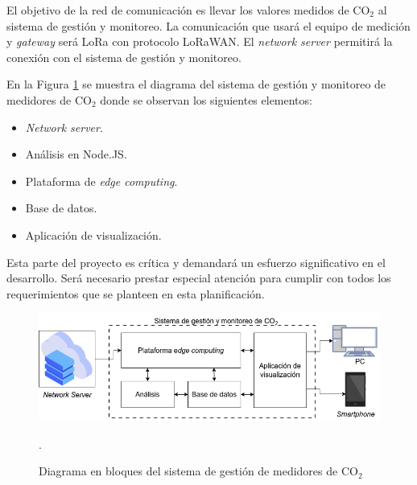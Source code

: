 \documentclass[
11pt, %
]{charter}
\begin{document}
El objetivo de la red de comunicación es llevar los valores medidos de CO$_{2}$ al sistema de gestión y monitoreo. La comunicación que usará el equipo de medición y \textit{gateway} será LoRa con protocolo LoRaWAN. El \textit{network server }permitirá la conexión con el sistema de gestión y monitoreo.

En la Figura \ref{fig:diagBloque2} se muestra el diagrama del sistema de gestión y monitoreo de medidores de CO$_{2}$ donde se observan los siguientes elementos:
\begin{itemize}
	\item \textit{Network server}.
	\item Análisis en Node.JS.
	\item Plataforma de \textit{edge computing}.
	\item Base de datos.
	\item Aplicación de visualización.
\end{itemize}

Esta parte del proyecto es crítica y demandará un esfuerzo significativo en el desarrollo. Será necesario prestar especial atención para cumplir con todos los requerimientos que se planteen en esta planificación.

\begin{figure}[htpb]
\centering 
\includegraphics[width=\textwidth]{./Figuras/diagBloque2.png}
\caption{Diagrama en bloques del sistema de gestión de medidores de CO$_{2}$}.
\label{fig:diagBloque2}
\end{figure}
\vspace{25px}
\end{document}
